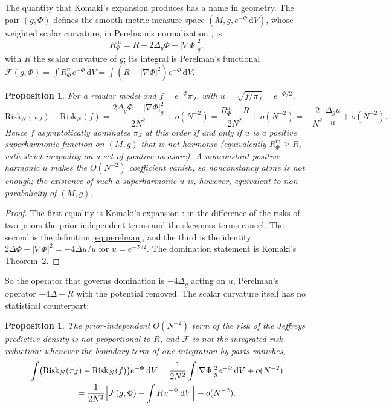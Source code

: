 \documentclass[11pt]{amsart}
\newcommand{\dd}{\,\mathrm{d}}
\newcommand{\abs}[1]{\lvert #1\rvert}
\theoremstyle{plain}
\newtheorem{proposition}[theorem]{Proposition}
\theoremstyle{definition}
\theoremstyle{remark}
\begin{document}
The quantity that Komaki's expansion produces has a name in geometry. The pair
$(g,\Phi)$ defines the smooth metric measure space $(M,g,e^{-\Phi}\dd V)$,
whose weighted scalar curvature, in Perelman's normalization
\cite[Remark~1.3]{perelman2002}, is
\begin{equation}\label{eq:perelman}
R^{\mathrm m}_\Phi=R+2\Delta_g\Phi-\abs{\nabla\Phi}_g^2 ,
\end{equation}
with $R$ the scalar curvature of $g$; its integral is Perelman's functional
$\mathcal F(g,\Phi)=\int R^{\mathrm m}_\Phi e^{-\Phi}\dd V=\int(R+\abs{\nabla\Phi}^2)e^{-\Phi}\dd V$.

\begin{proposition}\label{prop:komaki}
For a regular model and $f=e^{-\Phi}\pi_J$, with $u=\sqrt{f/\pi_J}=e^{-\Phi/2}$,
\begin{equation}\label{eq:k1}
\mathrm{Risk}_N(\pi_J)-\mathrm{Risk}_N(f)
=\frac{2\Delta_g\Phi-\abs{\nabla\Phi}_g^2}{2N^2}+o(N^{-2})
=\frac{R^{\mathrm m}_\Phi-R}{2N^2}+o(N^{-2})
=-\frac{2}{N^2}\,\frac{\Delta_gu}{u}+o(N^{-2}).
\end{equation}
Hence $f$ asymptotically dominates $\pi_J$ at this order if and only if $u$ is a
positive superharmonic function on $(M,g)$ that is not harmonic (equivalently
$R^{\mathrm m}_\Phi\ge R$, with strict inequality on a set of positive measure).
A nonconstant positive \emph{harmonic} $u$ makes the $O(N^{-2})$ coefficient
vanish, so nonconstancy alone is not enough; the existence of such a
superharmonic $u$ is, however, equivalent to non-parabolicity of $(M,g)$.
\end{proposition}

\begin{proof}
The first equality is Komaki's expansion \cite[eqs.~(3)--(5)]{komaki2006}: in
the difference of the risks of two priors the prior-independent terms and the
skewness terms cancel. The second is the definition \eqref{eq:perelman}, and
the third is the identity $2\Delta\Phi-\abs{\nabla\Phi}^2=-4\Delta u/u$ for
$u=e^{-\Phi/2}$. The domination statement is Komaki's Theorem~2.
\end{proof}

So the operator that governs domination is $-4\Delta_g$ acting on $u$,
Perelman's operator $-4\Delta+R$ with the potential removed. The scalar
curvature itself has no statistical counterpart:

\begin{proposition}\label{prop:noR}
The prior-independent $O(N^{-2})$ term of the risk of the Jeffreys predictive
density is not proportional to $R$, and $\mathcal F$ is not the integrated risk
reduction: whenever the boundary term of one integration by parts vanishes,
\begin{multline}\label{eq:k2}
\int\bigl(\mathrm{Risk}_N(\pi_J)-\mathrm{Risk}_N(f)\bigr)e^{-\Phi}\dd V
=\frac{1}{2N^2}\int\abs{\nabla\Phi}^2_ge^{-\Phi}\dd V+o(N^{-2})\\
=\frac{1}{2N^2}\Bigl[\mathcal F(g,\Phi)-\int R\,e^{-\Phi}\dd V\Bigr]+o(N^{-2}).
\end{multline}
\end{proposition}
\end{document}

